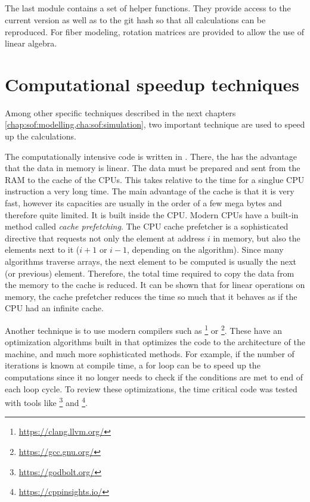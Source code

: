 \subsection{}
% 
The last module contains a set of helper functions.
They provide access to the current version as well as to the git hash so that all calculations can be reproduced.
For fiber modeling, rotation matrices are provided to allow the use of linear algebra.
% 
% 
% 

\section{Computational speedup techniques}\label{sec:theorySpeedup}
%
Among other specific techniques described in the next chapters \cref{chap:sof:modelling,cha:sof:simulation}, two important technique are used to speed up the calculations.
\par
%
The computationally intensive code is written in \cpp{}.
There, the  has the advantage that the data in memory is linear.
The data must be prepared and sent from the \ac{RAM} to the cache of the \acp{CPU}.
This takes relative to the time for a singlue \ac{CPU} instruction a very long time.
The main advantage of the cache is that it is very fast, however its capacities are usually in the order of a few mega bytes and therefore quite limited.
It is built inside the \ac{CPU}.
Modern \acp{CPU} have a built-in method called \textit{cache prefetching}.
The \ac{CPU} cache prefetcher is a sophisticated directive that requests not only the element at address $i$ in memory, but also the elements next to it ($i+1$ or $i-1$, depending on the algorithm).
Since many algorithms traverse arrays, the next element to be computed is usually the next (or previous) element.
Therefore, the total time required to copy the data from the memory to the cache is reduced.
It can be shown that for linear operations on memory, the cache prefetcher reduces the time so much that it behaves as if the \ac{CPU} had an infinite cache.
\par
%
Another technique is to use modern compilers such as \footnote{\url{https://clang.llvm.org/}} or \footnote{\url{https://gcc.gnu.org/}}.
These have an optimization algorithms built in that optimizes the code to the architecture of the machine, and much more sophisticated methods.
For example, if the number of iterations is known at compile time, a for loop can be  to speed up the computations since it no longer needs to check if the conditions are met to end of each loop cycle.
To review these optimizations, the time critical code was tested with tools like \footnote{\url{https://godbolt.org/}} and \footnote{\url{https://cppinsights.io/}}.
%
